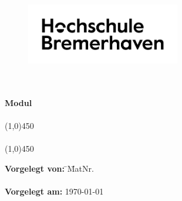 \setmainfont{TeX Gyre Adventor}
\thispagestyle{empty}
\begin{figure}[h!]
	\centering
	\includegraphics[width=0.6\textwidth]{src/abbildungen/logoneu.png}
\end{figure}
\begin{center}
	\large{\textbf{\department}}\\
	\large{\textbf{\studyprogram}}\\
	\vspace{1cm}
	{
		\large{\textbf{Modul\\ \modulname}}\\
	}
	\vspace*{\fill}
	\line(1,0){450}\\
	\doublespacing
	\textbf{\Large{\thetitle}}\\
	\line(1,0){450}\\
\end{center}
\vspace*{\fill}
\onehalfspacing
\small{
\begin{flushleft}
	\begin{tabbing}
		\textbf{Vorgelegt von:} \hspace*{0.8cm}\= \theauthor \hspace*{\myspace}\= MatNr. \matriculationnumber \\


		\secondauthor
		\thirdauthor
		\fourthauthor
    \\


		\textbf{Vorgelegt am:} \> \today\\
		\\
		{
			\auditor\\
      \secondauditor\\
		}
	\end{tabbing}
\end{flushleft}}
\setmainfont{TeX Gyre Termes}
